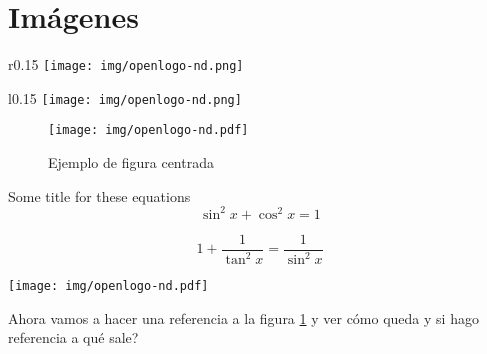 \documentclass[12pt,a4paper,openany]{book}
\begin{document}
%
%



\section{Imágenes}
\begin{wrapfigure}{r}{0.15\textwidth} %
    \centering %
    \vspace{-10pt} %
    \texttt{[image: img/openlogo-nd.png]}
\end{wrapfigure}\Blindtext[1]


\begin{wrapfigure}{l}{0.15\textwidth} %
    \centering
    \texttt{[image: img/openlogo-nd.png]}
\end{wrapfigure}\Blindtext[1]



\begin{figure}
	\centering
	\texttt{[image: img/openlogo-nd.pdf]}
	\caption{Ejemplo de figura centrada}
	\label{fig:logo}
\end{figure}

\begin{tcolorbox}{Some title for these equations}
\[ \sin^2x+\cos^2x=1\]

\[ 1 + \frac{1}{\tan^2x}=\frac{1}{\sin^2x}\]
\end{tcolorbox}


\begin{tcolorbox}
	\centering
	\texttt{[image: img/openlogo-nd.pdf]}
\end{tcolorbox}


Ahora vamos a hacer una referencia a la figura \ref{fig:logo} y ver cómo queda y si hago referencia a \pageref{fig:logo} qué sale?
	
\end{document}
